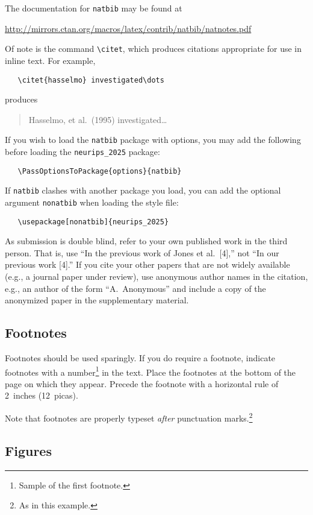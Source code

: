 \documentclass{article}
\begin{document}
The documentation for \verb+natbib+ may be found at
\begin{center}
    \url{http://mirrors.ctan.org/macros/latex/contrib/natbib/natnotes.pdf}
\end{center}
Of note is the command \verb+\citet+, which produces citations appropriate for
use in inline text.  For example,
\begin{verbatim}
   \citet{hasselmo} investigated\dots
\end{verbatim}
produces
\begin{quote}
    Hasselmo, et al.\ (1995) investigated\dots
\end{quote}


If you wish to load the \verb+natbib+ package with options, you may add the
following before loading the \verb+neurips_2025+ package:
\begin{verbatim}
   \PassOptionsToPackage{options}{natbib}
\end{verbatim}


If \verb+natbib+ clashes with another package you load, you can add the optional
argument \verb+nonatbib+ when loading the style file:
\begin{verbatim}
   \usepackage[nonatbib]{neurips_2025}
\end{verbatim}


As submission is double blind, refer to your own published work in the third
person. That is, use ``In the previous work of Jones et al.\ [4],'' not ``In our
previous work [4].'' If you cite your other papers that are not widely available
(e.g., a journal paper under review), use anonymous author names in the
citation, e.g., an author of the form ``A.\ Anonymous'' and include a copy of the anonymized paper in the supplementary material.


\subsection{Footnotes}


Footnotes should be used sparingly.  If you do require a footnote, indicate
footnotes with a number\footnote{Sample of the first footnote.} in the
text. Place the footnotes at the bottom of the page on which they appear.
Precede the footnote with a horizontal rule of 2~inches (12~picas).


Note that footnotes are properly typeset \emph{after} punctuation
marks.\footnote{As in this example.}


\subsection{Figures}
\end{document}
